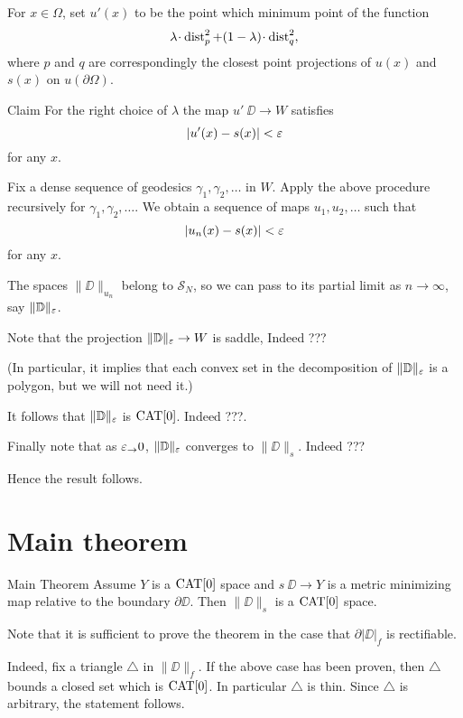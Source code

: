 \documentclass[a4paper,10pt]{amsart}
\begin{document}
For $x\in \Omega$, set $u'(x)$ to be the point which minimum point of the function 
\[\lambda\cdot\dist^2_p+(1-\lambda)\cdot\dist^2_q,\]
where $p$ and $q$ are correspondingly the closest point projections of  $u(x)$ and $s(x)$ on $u(\partial\Omega)$.

\begin{nnthm}{Claim}
For the right choice of $\lambda$ the map $u'\:\DD\to W$ satisfies
\[|u'(x)-s(x)|<\varepsilon\] 
for any $x$.
\end{nnthm}



Fix a dense sequence of geodesics $\gamma_1,\gamma_2,\dots$ in $W$.
Apply the above procedure recursively
for $\gamma_1,\gamma_2,\dots$.
We obtain a sequence of maps $u_1,u_2,\dots$ such that 
\[|u_n(x)-s(x)|<\varepsilon\]
for any $x$.

The spaces $\|\DD\|_{u_n}$ belong to $\mathcal{S}_N$,
so we can pass to its partial limit as $n\to\infty$,
say $\|\mathbb{D}\|_\varepsilon$.


Note that the projection $\|\mathbb{D}\|_\varepsilon\to W$ is saddle,
Indeed ???

(In particular, it implies that each convex set in the decomposition of $\|\mathbb{D}\|_\varepsilon$ is a polygon, but we will not need it.)

It follows that $\|\mathbb{D}\|_\varepsilon$ is $\mathop{\rm CAT}\nolimits[0]$. Indeed ???.

Finally note that as $\varepsilon_\to 0$, $\|\mathbb{D}\|_\varepsilon$ converges to $\|\DD\|_s$. Indeed ???

Hence the result follows.
\qeds



\section{Main theorem}

\begin{thm}{Main Theorem}
Assume $Y$ is a $\mathop{\rm CAT}\nolimits[0]$ space 
and $s\:\DD\to Y$ is a metric minimizing map relative to the boundary $\partial\DD$.
Then $\|\DD\|_s$ is a $\mathop{\rm CAT}\nolimits[0]$ space.
\end{thm}


Note that it is sufficient to prove the theorem 
in the case that $\partial |\DD|_f$ is rectifiable.

Indeed, fix a triangle $\triangle$ in $\|\DD\|_f$.
If the above case has been proven, 
then $\triangle$ bounds a closed set which is $\mathop{\rm CAT}\nolimits[0]$.
In particular $\triangle$ is thin.
Since $\triangle$ is arbitrary, the statement follows.
\end{document}
